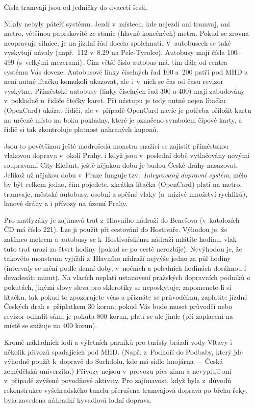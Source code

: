 Čísla tramvají jsou od jedničky do dvaceti šesti.

Nikdy nebyly páteří systému. Jezdí v~místech, kde nejezdí ani
tramvaj, ani metro, většinou paprskovitě ze stanic (hlavně
konečných) metra. Pokud se zrovna neopravuje silnice, je na jízdní
řád docela spolehnutí. V~autobusech se také vyskytují návaly
(např.~112 v~8.29 na Pelc-Tyrolce). Autobusy mají čísla 100--499
(s~velkými mezerami). Čím větší číslo autobus má, tím dále od
centra systému Vás doveze. Autobusové linky číselných řad 100
a~200 patří pod MHD a není nutné lítačku komukoli ukazovat, ale
i~v~nich se čas od času revizor vyskytne. Příměstské autobusy (linky
číselných řad 300 a 400) mají zabudovány v~pokladně u~řidiče
čtečky karet. Při nástupu je tedy nutné nejen lítačku (OpenCard)
ukázat řidiči, ale v~případě OpenCard navíc je potřeba přiložit
kartu na určené místo na boku pokladny, které je označeno symbolem
čipové karty, a řidič si tak zkontroluje platnost nahraných
kuponů.

Jsou to povětšinou ještě modrošedá monstra snažící se zajistit
příměstskou vlakovou dopravu v~okolí Prahy. i když jsou v~poslední
době vytlačovány novými soupravami City Elefant, ještě nějakou
dobu je budou České dráhy nasazovat. Jelikož už nějakou dobu
v~Praze funguje tzv.~{\it Integrovaný dopravní systém}, mělo by
být celkem jedno, čím pojedete, zkrátka lítačka (OpenCard) platí
na metro, tramvaje, městské autobusy, osobní a spěšné vlaky
(a~mizivé množství rychlíků), lanové dráhy a i přívozy na území
Prahy.

Pro matfyzáky je zajímavá trať z~Hlavního nádraží do Benešova
(v~katalozích ČD má číslo 221). Lze ji použít při cestování do
Hostivaře. Výhodou je, že zatímco metrem a autobusy se
k~Hostivařskému nádraží mlátíte hodinu, vlak tuto trať urazí za
čtvrt hodiny (pokud se po cestě nerozbije). Nevýhodou je, že
takovéto monstrum vyjíždí z~Hlavního nádraží nejvýše jedno za půl
hodiny (intervaly se mění podle denní doby, v~nočních a poledních
hodinách dosáhnou i devadesáti minut). Na vlacích neplatí
ustanovení pražských dopravních podniků o pokutách, jinými slovy
sleva pro sklerotiky se neposkytuje; zapomenete-li si lítačku, tak
pokud to zpozorujete včas a přiznáte se průvodčímu, zaplatíte
jízdné Českých drah s~příplatkem 30 korun; pokud Vás bude muset
průvodčí nebo revizor odhalit sám, je pokuta 800 korun, platí se
ale jinde (při zaplacení na místě se snižuje na 400 korun).

Kromě nákladních lodí a výletních parníků pro turisty brázdí vody
Vltavy i několik přívozů spadajících pod MHD. (Např. z~Podhoří do
Podbaby, který jde výhodně použít k~dopravě do Suchdolu, kde má
sídlo hnojárna --- Česká zemědělská univerzita.) Přívozy nejsou
v~provozu přes zimu a nevyplují ani v~případě zvýšené povodňové
aktivity. Pro zajímavost, když byla z~důvodů rekonstrukce
vyšehradského tunelu přerušena tramvajová doprava po břehu řeky,
byla zavedena náhradní kyvadlová lodní doprava.

